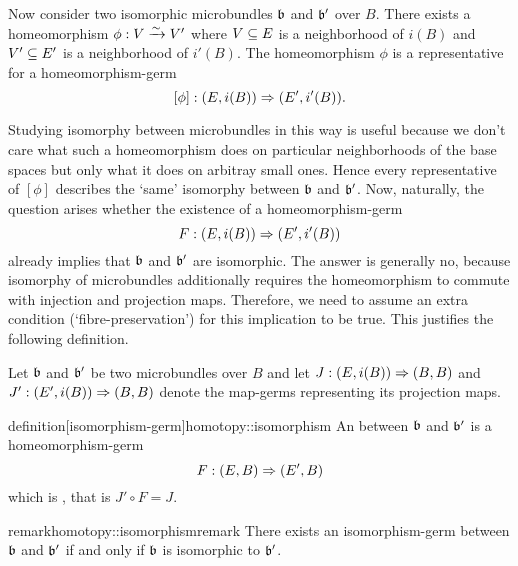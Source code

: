 \begin{myparagraph}
    Now consider two isomorphic microbundles $\bb$ and $\bb'$ over $B$.
    There exists a homeomorphism $\phi: V \xrightarrow{\sim} V'$ where
    $V \subseteq{} E$ is a neighborhood of $i(B)$ and $V' \subseteq{} E'$ is a neighborhood of $i'(B)$.
    The homeomorphism $\phi$ is a representative for a homeomorphism-germ
    \[ [\phi]: (E, i(B)) \Rightarrow{} (E', i'(B)). \]
    
    Studying isomorphy between microbundles in this way is useful because we don't care what such a
    homeomorphism does on particular neighborhoods of the base spaces but only what it does on arbitray small ones.
    Hence every representative of $[\phi]$ describes the `same' isomorphy between $\bb$ and $\bb'$.
    Now, naturally, the question arises whether the existence of a homeomorphism-germ
    \[ F: (E, i(B)) \Rightarrow{} (E', i'(B)) \]
    already implies that $\bb$ and $\bb'$ are isomorphic.
    The answer is generally no, because isomorphy of microbundles additionally requires 
    the homeomorphism to commute with injection and projection maps.
    Therefore, we need to assume an extra condition (`fibre-preservation')
    for this implication to be true.
    This justifies the following definition.
    
    Let $\bb$ and $\bb'$ be two microbundles over $B$ and
    let $J: (E, i(B)) \Rightarrow{} (B, B)$ and $J': (E', i(B)) \Rightarrow{} (B, B)$
    denote the map-germs representing its projection maps.
\end{myparagraph}

\begin{mystatement}{definition}[isomorphism-germ]{homotopy::isomorphism}
    An  between $\bb$ and $\bb'$ is a homeomorphism-germ 
    \[ F: (E, B) \Rightarrow{} (E', B) \]
    which is , that is $J' \circ F = J$.
\end{mystatement}

\begin{mystatement}{remark}{homotopy::isomorphismremark}
    There exists an isomorphism-germ between $\bb$ and $\bb'$ if and only if $\bb$ is isomorphic to $\bb'$.
\end{mystatement}